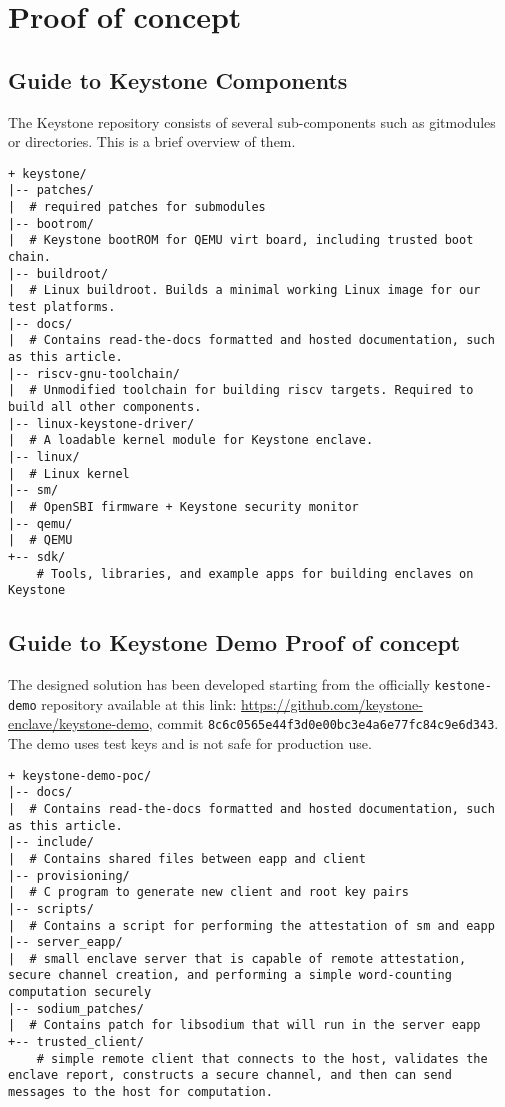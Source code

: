 
\section{Proof of concept}
\subsection{Guide to Keystone Components}
The Keystone repository consists of several sub-components such as gitmodules or directories. This is a brief overview of them. \\
\begin{lstlisting}[frame=single]
+ keystone/
|-- patches/
|  # required patches for submodules
|-- bootrom/
|  # Keystone bootROM for QEMU virt board, including trusted boot chain.
|-- buildroot/
|  # Linux buildroot. Builds a minimal working Linux image for our test platforms.
|-- docs/
|  # Contains read-the-docs formatted and hosted documentation, such as this article.
|-- riscv-gnu-toolchain/
|  # Unmodified toolchain for building riscv targets. Required to build all other components.
|-- linux-keystone-driver/
|  # A loadable kernel module for Keystone enclave.
|-- linux/
|  # Linux kernel
|-- sm/
|  # OpenSBI firmware + Keystone security monitor
|-- qemu/
|  # QEMU
+-- sdk/
    # Tools, libraries, and example apps for building enclaves on Keystone        
\end{lstlisting}

\subsection{Guide to Keystone Demo Proof of concept}
The designed solution has been developed starting from the officially \texttt{kestone-demo} repository available at this link: \url{https://github.com/keystone-enclave/keystone-demo}, commit \texttt{8c6c0565e44f3d0e00bc3e4a6e77fc84c9e6d343}. The demo uses test keys and is not safe for production use. \\
\begin{lstlisting}[frame=single]
+ keystone-demo-poc/
|-- docs/
|  # Contains read-the-docs formatted and hosted documentation, such as this article.
|-- include/
|  # Contains shared files between eapp and client
|-- provisioning/
|  # C program to generate new client and root key pairs
|-- scripts/
|  # Contains a script for performing the attestation of sm and eapp
|-- server_eapp/
|  # small enclave server that is capable of remote attestation, secure channel creation, and performing a simple word-counting computation securely
|-- sodium_patches/
|  # Contains patch for libsodium that will run in the server eapp
+-- trusted_client/
    # simple remote client that connects to the host, validates the enclave report, constructs a secure channel, and then can send messages to the host for computation.       
\end{lstlisting}

